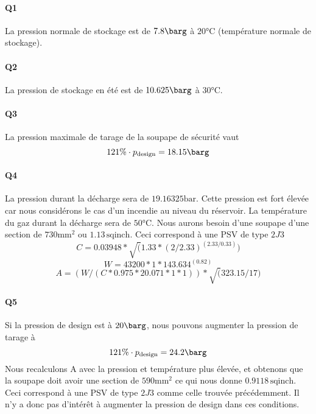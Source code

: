 

\paragraph{Q1} La pression normale de stockage est de $7.8 \barg$ à $20\si{\celsius}$ 
(température normale de stockage).

\paragraph{Q2} La pression de stockage en été est de $10.625 \barg$ à $30\si{\celsius}$.

\paragraph{Q3} La pression maximale de tarage de la soupape de sécurité vaut 
\[ 121\% \cdot p_{\text{design}} = 18.15\barg \]

\paragraph{Q4} 
La pression durant la décharge sera de $19.16325 \si{\bar}$. 
Cette pression est fort élevée car nous considérons le cas d'un incendie au niveau du réservoir. 
La température du gaz durant la décharge sera de $50\si{\celsius}$. 
Nous aurons besoin d'une soupape d'une section de $730\si{\milli\meter\squared}$ 
ou $1.13 \, \text{sqinch}$. Ceci correspond à une PSV de type $2J3$
\[ C = 0.03948 * \sqrt(1.33 * (2 / 2.33)^(2.33 / 0.33)) \]
\[ W = 43200 * 1 * 143.634^(0.82) \]
\[ A = (W / (C * 0.975 * 20.071 * 1 * 1)) * \sqrt(323.15/17) \]

\paragraph{Q5} 
Si la pression de design est à $20\barg$, nous pouvons augmenter la pression de tarage à \[ 121\% \cdot p_{\text{design}} = 24.2\barg \]
Nous recalculons A avec la pression et température plus élevée, et obtenons que la soupape doit avoir une section de $590\si{\milli\meter\squared}$
ce qui nous donne $0.9118 \, \text{sqinch}$. Ceci correspond à une PSV de type $2J3$ comme celle trouvée précédemment. Il n'y a donc pas d'intérêt
à augmenter la pression de design dans ces conditions.

